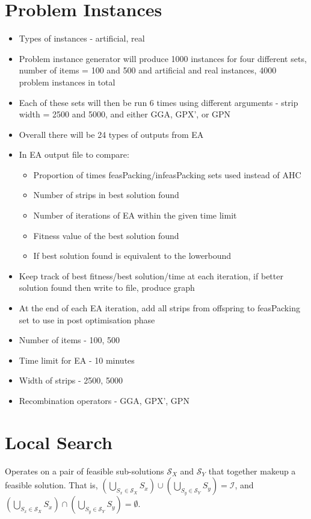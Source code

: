 \documentclass{elsarticle}
\begin{document}
\section{Problem Instances}
\begin{itemize}
	\item Types of instances - artificial, real
	\item Problem instance generator will produce 1000 instances for four different sets, number of items = 100 and 500 and artificial and real instances, 4000 problem instances in total
	\item Each of these sets will then be run 6 times using different arguments - strip width = 2500 and 5000, and either GGA, GPX', or GPN
	\item Overall there will be 24 types of outputs from EA
	\item In EA output file to compare:
	\begin{itemize}
		\item Proportion of times feasPacking/infeasPacking sets used instead of AHC
		\item Number of strips in best solution found
		\item Number of iterations of EA within the given time limit
		\item Fitness value of the best solution found
		\item If best solution found is equivalent to the lowerbound
	\end{itemize}
	\item Keep track of best fitness/best solution/time at each iteration, if better solution found then write to file, produce graph
\item At the end of each EA iteration, add all strips from offspring to feasPacking set to use in post optimisation phase
\item Number of items - 100, 500
\item Time limit for EA - 10 minutes
\item Width of strips - 2500, 5000
\item Recombination operators - GGA, GPX', GPN
\end{itemize}

\section{Local Search}
Operates on a pair of feasible sub-solutions $\mathcal{S}_X$ and $\mathcal{S}_Y$ that together makeup a feasible solution. That is, $(\bigcup_{S_x \in \mathcal{S}_X} S_x) \cup (\bigcup_{S_y \in \mathcal{S}_Y} S_y) = \mathcal{I}$, and $(\bigcup_{S_x \in \mathcal{S}_X} S_x) \cap (\bigcup_{S_y \in \mathcal{S}_Y} S_y) = \emptyset$.
\end{document}
